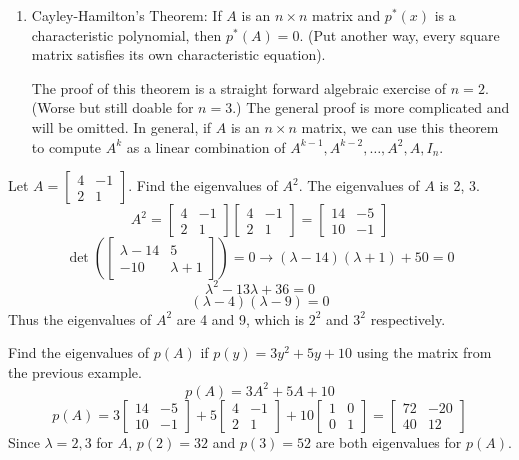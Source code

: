 \documentclass[12pt]{article}
\begin{document}
\begin{enumerate}
\begin{enumerate}
\end{enumerate} \item \begin{theorem} Cayley-Hamilton's Theorem: If $A$ is an $n \times n$ matrix and $p^*(x)$ is a characteristic polynomial, then $p^*(A) = 0$. (Put another way, every square matrix satisfies its own characteristic equation). \end{theorem} The proof of this theorem is a straight forward algebraic exercise of $n = 2$. (Worse but still doable for $n = 3$.) The general proof is more complicated and will be omitted. In general, if $A$ is an $n \times n$ matrix, we can use this theorem to compute $A^k$ as a linear combination of $A^{k - 1}, A^{k - 2}, \dots, A^2, A, I_n$. \end{enumerate} 
\begin{example} Let $A = \begin{bmatrix} 4 & -1 \\ 2 & 1 \end{bmatrix}$. Find the eigenvalues of $A^2$. The eigenvalues of $A$ is 2, 3. 
$$A^2 = \begin{bmatrix} 4 & -1 \\ 2 & 1 \end{bmatrix}\begin{bmatrix} 4 & -1 \\ 2 & 1 \end{bmatrix} = \begin{bmatrix} 14 & -5 \\ 10 & -1 \end{bmatrix} $$ 
$$\det(\begin{bmatrix} \lambda - 14 & 5 \\ -10 & \lambda + 1 \end{bmatrix}) = 0 \rightarrow (\lambda - 14)(\lambda + 1) + 50 = 0 $$ $$\lambda^2 - 13\lambda + 36 = 0 $$
$$ (\lambda - 4)(\lambda - 9) = 0 $$ Thus the eigenvalues of $A^2$ are 4 and 9, which is $2^2$ and $3^2$ respectively. \end{example} 
\begin{example} Find the eigenvalues of $p(A)$ if $p(y) = 3y^2 + 5y + 10$ using the matrix from the previous example. $$p(A) = 3A^2 + 5A + 10$$ $$ p(A) = 3\begin{bmatrix} 14 & -5 \\ 10 & -1 \end{bmatrix} + 5\begin{bmatrix} 4 & -1 \\ 2 & 1 \end{bmatrix} + 10\begin{bmatrix} 1 & 0 \\ 0 & 1 \end{bmatrix} = \begin{bmatrix} 72 & -20 \\ 40 & 12 \end{bmatrix} $$ Since $\lambda = 2, 3$ for $A$, $p(2) = 32$ and $p(3) = 52$ are both eigenvalues for $p(A)$. \end{example} 
\end{document}
